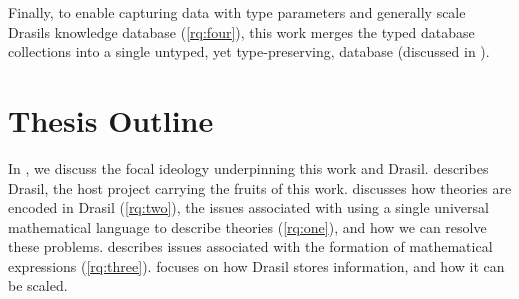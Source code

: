 Finally, to enable capturing data with type parameters and generally scale
Drasils knowledge database (\ref{rq:four}), this work merges the typed database
collections into a single untyped, yet type-preserving, database (discussed in
).


\section{Thesis Outline}
\label{sec:intro:outline}

In , we discuss the focal ideology underpinning this work
and Drasil.  describes Drasil, the host project carrying the
fruits of this work.  discusses how theories are encoded
in Drasil (\ref{rq:two}), the issues associated with using a single universal
mathematical language to describe theories (\ref{rq:one}), and how we can
resolve these problems.  describes issues associated with
the formation of mathematical expressions (\ref{rq:three}).
 focuses on how Drasil stores information, and how it
can be scaled.
